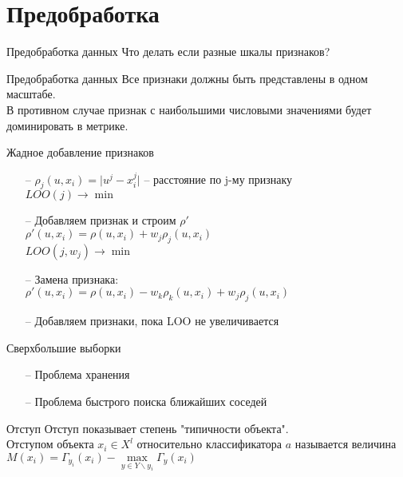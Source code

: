 \documentclass[10pt]{beamer}
\begin{document}
\section{Предобработка}

\begin{frame}{Предобработка данных}
	Что делать если разные шкалы признаков?
\end{frame}

\begin{frame}{Предобработка данных}
	Все признаки должны быть представлены \alert{в одном масштабе}. \\
	В противном случае признак с наибольшими числовыми значениями будет доминировать в метрике.
\end{frame}


\begin{frame}{Жадное добавление признаков}
	\begin{itemize} [<+- | alert@+>]
		\item[--] ${\rho_j(u, x_i) = \vert u^j - x_i^j \vert}$ -- расстояние по j-му признаку\\
		          $LOO(j) \rightarrow \min$\\
		\item[--] Добавляем признак и строим $\rho'$\\
							${\rho'(u, x_i) = \rho(u, x_i) + w_j\rho_j(u, x_i)}$\\
							$LOO(j, w_j) \rightarrow \min$\\
		\item[--] Замена признака:\\
            		${\rho'(u, x_i) = \rho(u, x_i) - w_k\rho_k(u, x_i) + w_j\rho_j(u, x_i)}$\\
		\item[--] Добавляем признаки, пока LOO не увеличивается
	\end{itemize}
\end{frame}

\begin{frame}{Сверхбольшие выборки}
	\begin{itemize} [<+- | alert@+>]
		\item[--] Проблема хранения
		\item[--] Проблема быстрого поиска ближайших соседей
	\end{itemize}
\end{frame}

\begin{frame}{Отступ}
	Отступ показывает степень "типичности объекта".\\
	\bigbreak
	Отступом объекта ${x_i \in X^l}$ относительно классификатора $a$ называется величина\\
	${M(x_i) = \Gamma_{y_i}(x_i) - \max\limits_{y \in Y\backslash y_i} \Gamma_y(x_i)}$
\end{frame}
\end{document}
